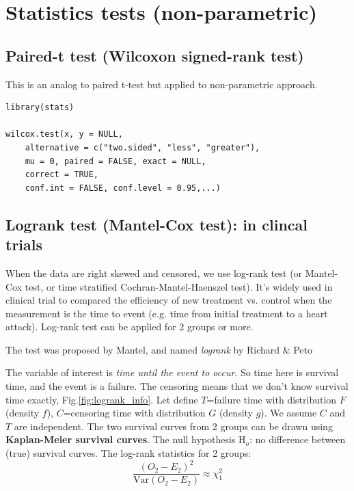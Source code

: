 
\chapter{Statistics tests (non-parametric)}
\label{chap:statistics-tests-non}

\section{Paired-t test (Wilcoxon signed-rank test)}
\label{sec:paired-t-test-1}

This is an analog to paired t-test but applied to non-parametric
approach. 


\begin{lstlisting}
library(stats)

wilcox.test(x, y = NULL, 
    alternative = c("two.sided", "less", "greater"), 
    mu = 0, paired = FALSE, exact = NULL, 
    correct = TRUE,
    conf.int = FALSE, conf.level = 0.95,...)
\end{lstlisting}

\section{Logrank test (Mantel-Cox test): in clincal trials}

When the data are right skewed and censored, we use log-rank test (or Mantel-Cox
test, or time stratified Cochran-Mantel-Haenszel test).
It's widely used in clinical trial to compared the efficiency of new treatment
vs. control when the measurement is the time to event (e.g. time from initial
treatment to a heart attack). Log-rank test can be applied for 2 groups or more.

\begin{framed}
The test was proposed by Mantel, and named {\it logrank} by Richard \& Peto
\end{framed}


The variable of interest is {\it time until the event to occur}. So time here is
survival time, and the event is a failure. The censoring means that we don't
know survival time exactly, Fig.\ref{fig:logrank_info}. Let define $T$=failure
time with distribution $F$ (density $f$), $C$=censoring time with distribution
$G$ (density $g$). We assume $C$ and $T$ are independent. The two survival
curves from 2 groups can be drawn using {\bf Kaplan-Meier survival curves}. The
null hypothesis H$_o$: no difference between (true) survival curves. The
log-rank statistics for 2 groups:
\begin{equation}
\frac{\left(O_2-E_2\right)^2 }{\text{Var}\left(O_2-E_2\right) } \approx \chi^2_1
\end{equation}

